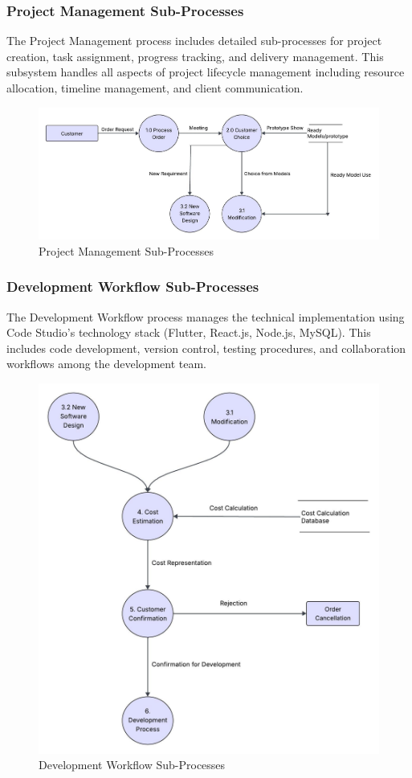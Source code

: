 \documentclass[12pt,a4paper]{article}
\begin{document}
\subsubsection{Project Management Sub-Processes}

The Project Management process includes detailed sub-processes for project creation, task assignment, progress tracking, and delivery management. This subsystem handles all aspects of project lifecycle management including resource allocation, timeline management, and client communication.

\begin{figure}[H]
  \centering
  \includegraphics[width=0.9\linewidth]{"Thought web weaver (3).jpeg"}
  \caption{Project Management Sub-Processes}
\end{figure}

\subsubsection{Development Workflow Sub-Processes}

The Development Workflow process manages the technical implementation using Code Studio's technology stack (Flutter, React.js, Node.js, MySQL). This includes code development, version control, testing procedures, and collaboration workflows among the development team.

\begin{figure}[H]
  \centering
  \includegraphics[width=0.9\linewidth]{"Thought web weaver (4).jpeg"}
  \caption{Development Workflow Sub-Processes}
\end{figure}
\end{document}
